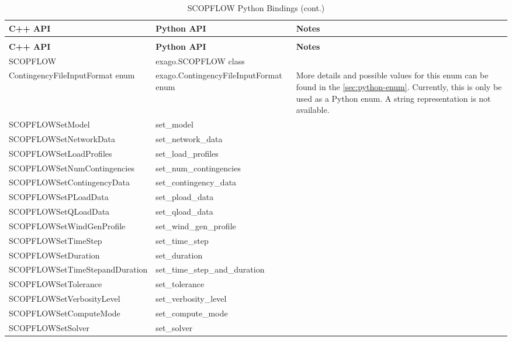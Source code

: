 { \footnotesize
  \begin{longtable}{|>{\ttfamily}p{}|>{\ttfamily}p{}|p{}|}
    \caption{SCOPFLOW Python Bindings}\label{table:scopflow-python-bindings} \\ 
    \hline
    \textbf{\textrm{C++ API}} & \textbf{\textrm{Python API}} & \textbf{Notes}\\ [0.5ex]  
    \hline
    \endfirsthead
    \caption{SCOPFLOW Python Bindings (cont.)} \\ 
    \hline
    \textbf{\textrm{C++ API}} & \textbf{\textrm{Python API}} & \textbf{Notes}\\ [0.5ex]  
    \hline
    \endhead
    SCOPFLOW & exago.SCOPFLOW class &  \\ \hline
    ContingencyFileInputFormat enum & exago.ContingencyFileInputFormat enum & More details and possible values for this enum can be found in the \ref{sec:python-enum}.  Currently, this is only be used as a Python enum. A string representation is not available. \\ \hline
    SCOPFLOWSetModel & set\_model &  \\ \hline
    SCOPFLOWSetNetworkData & set\_network\_data &  \\ \hline
    SCOPFLOWSetLoadProfiles & set\_load\_profiles & \\ \hline
    SCOPFLOWSetNumContingencies & set\_num\_contingencies &  \\ \hline
    SCOPFLOWSetContingencyData & set\_contingency\_data &  \\ \hline
    SCOPFLOWSetPLoadData & set\_pload\_data &  \\ \hline
    SCOPFLOWSetQLoadData & set\_qload\_data &  \\ \hline
    SCOPFLOWSetWindGenProfile & set\_wind\_gen\_profile &  \\ \hline
    SCOPFLOWSetTimeStep & set\_time\_step &  \\ \hline
    SCOPFLOWSetDuration & set\_duration &  \\ \hline
    SCOPFLOWSetTimeStepandDuration & set\_time\_step\_and\_duration &  \\ \hline
    SCOPFLOWSetTolerance & set\_tolerance &  \\ \hline
    SCOPFLOWSetVerbosityLevel & set\_verbosity\_level &  \\ \hline
    SCOPFLOWSetComputeMode & set\_compute\_mode &  \\ \hline
    SCOPFLOWSetSolver & set\_solver &  \\ \hline

\end{longtable}}
